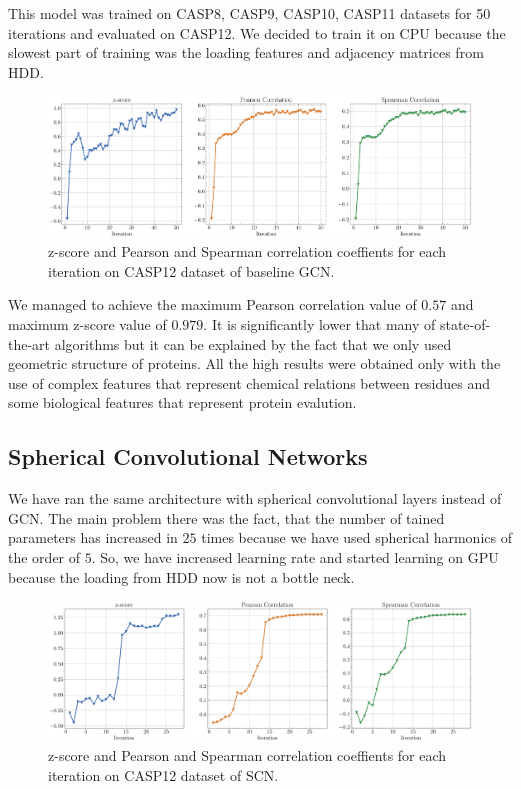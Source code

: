 \documentclass[12pt,twoside]{article}
\begin{document}
	This model was trained on CASP8, CASP9, CASP10, CASP11 datasets for 50 iterations and evaluated on CASP12. We decided to train
	it on CPU because the slowest part of training was the loading features and adjacency matrices from HDD.
	\begin{figure}[h]
		\centering
		\includegraphics[width=1.0\textwidth]{img/z_score_casp12.pdf}
		\caption{z-score and Pearson and Spearman correlation coeffients for each iteration on CASP12 dataset of baseline 
		GCN.}
		\label{fig:mesh1}
	\end{figure}

	We managed to achieve the maximum Pearson correlation value of $0.57$ and maximum z-score value of $0.979$. It is significantly lower
	that many of state-of-the-art algorithms\cite{Baldassarre2020GRAPHQAPM} but it can be explained by the fact that we only used geometric structure of proteins.
	All the high results were obtained only with the use of complex features that represent chemical relations between residues and some
	biological features that represent protein evalution\cite{Baldassarre2020GRAPHQAPM}.

	\subsection{Spherical Convolutional Networks}
	We have ran the same architecture with spherical convolutional layers instead of GCN. The main problem there was the fact, that
	the number of tained parameters has increased in $25$ times because we have used spherical harmonics of the order of $5$. So, we
	have increased learning rate and started learning on GPU because the loading from HDD now is not a bottle neck.
	\begin{figure}[h]
		\centering
		\includegraphics[width=1.0\textwidth]{img/z_score_casp12_sh.pdf}
		\caption{z-score and Pearson and Spearman correlation coeffients for each iteration on CASP12 dataset of SCN.}
		\label{fig:mesh1}
	\end{figure}
\end{document}
